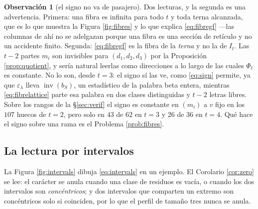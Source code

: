 \documentclass[11pt,reqno]{amsart}
\theoremstyle{plain}
\theoremstyle{definition}
\newtheorem{remark}[theorem]{Observación}
\newcommand{\inv}{\operatorname{inv}}
\begin{document}
\begin{remark}[el signo no va de pasajero]\label{rem:signsees}
Dos lecturas, y la segunda es una advertencia. Primera: una fibra es infinita para todo $t$ y toda
terna alcanzada, que es lo que muestra la Figura \ref{fig:fibres} y lo que explica
\eqref{eq:fibregf} ---las columnas de ahí no se adelgazan porque una fibra es una sección de
retículo y no un accidente finito. Segunda: \eqref{eq:fibregf} es la fibra de la \emph{terna} y no
la de $I_t$. Las $t-2$ partes $m_i$ son invisibles para $(d_1,d_2,d_3)$ por la Proposición
\ref{prop:quotient}, y sería natural leerlas como direcciones a lo largo de las cuales $\Phi_t$ es
constante. No lo son, desde $t=3$: el signo sí las ve, como \eqref{eq:sign} permite, ya que
$\varepsilon_\lambda$ lleva $\inv(b_S)$, un estadístico de la palabra beta entera, mientras
\eqref{eq:fibrelattice} parte esa palabra en dos clases distinguidas y $t-2$ letras libres. Sobre
los rangos de la \S\ref{sec:verif} el signo es constante en $(m_i)$ a $v$ fijo en los $107$ huecos
de $t=2$, pero solo en $43$ de $62$ en $t=3$ y $26$ de $36$ en $t=4$. Qué hace el signo sobre una
rama es el Problema \ref{prob:fibres}.
\end{remark}

\subsection{La lectura por intervalos}\label{sec:intervals}
La Figura \ref{fig:intervals} dibuja \eqref{eq:intervals} en un ejemplo. El Corolario \ref{cor:zero}
se lee: el carácter se anula cuando una clase de residuos es vacía, o cuando los dos intervalos son
\emph{concéntricos}; y dos intervalos que comparten un extremo son concéntricos solo si coinciden,
por lo que el perfil de tamaño tres nunca se anula.
\end{document}
